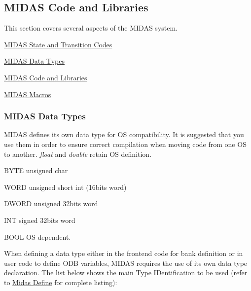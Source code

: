 \par
 \label{index_end}
\hypertarget{index_end}{}
  \subsection{MIDAS Code and Libraries}\label{F_Midas_Code_and_Libraries}


\par


This section covers several aspects of the MIDAS system.


\begin{DoxyItemize}
\item \hyperlink{RC_Run_States_and_Transitions_RC_state_transition}{MIDAS State and Transition Codes}
\item \hyperlink{F_Midas_Code_and_Libraries_F_Midas_Data_Types}{MIDAS Data Types}
\item \hyperlink{F_Midas_Code_and_Libraries_F_Midas_Library}{MIDAS Code and Libraries}
\item \hyperlink{F_Midas_Code_and_Libraries_F_midas_macro}{MIDAS Macros}
\end{DoxyItemize}

\label{F_Midas_Code_and_Libraries_idx_Midas_Data_Types}
\hypertarget{F_Midas_Code_and_Libraries_idx_Midas_Data_Types}{}
 \label{F_Midas_Code_and_Libraries_Midas_Data_Types}
\hypertarget{F_Midas_Code_and_Libraries_Midas_Data_Types}{}
 \hypertarget{F_Midas_Code_and_Libraries_F_Midas_Data_Types}{}\subsubsection{MIDAS Data Types}\label{F_Midas_Code_and_Libraries_F_Midas_Data_Types}
MIDAS defines its own data type for OS compatibility. It is suggested that you use them in order to ensure correct compilation when moving code from one OS to another. {\itshape float\/} and {\itshape double\/} retain OS definition.


\begin{DoxyItemize}
\item BYTE unsigned char
\item WORD unsigned short int (16bits word)
\item DWORD unsigned 32bits word
\item INT signed 32bits word
\item BOOL OS dependent.
\end{DoxyItemize}

When defining a data type either in the frontend code for bank definition or in user code to define ODB variables, MIDAS requires the use of its own data type declaration. The list below shows the main Type IDentification to be used (refer to \hyperlink{group__mdefineh}{Midas Define} for complete listing):


